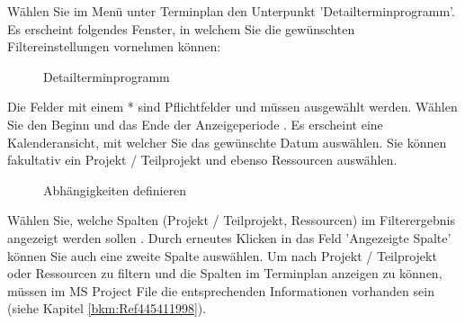 Wählen Sie im Menü unter Terminplan den Unterpunkt 'Detailterminprogramm'. Es erscheint folgendes Fenster, in welchem Sie die gewünschten Filtereinstellungen vornehmen können:

\begin{figure}[H]
\caption{Detailterminprogramm}
\end{figure}

Die Felder mit einem * sind Pflichtfelder und müssen ausgewählt werden. Wählen Sie den Beginn und das Ende der Anzeigeperiode . Es erscheint eine Kalenderansicht, mit welcher Sie das gewünschte Datum auswählen. Sie können fakultativ ein Projekt / Teilprojekt  und ebenso Ressourcen  auswählen.

\begin{figure}[H]
\caption{Abhängigkeiten definieren}
\end{figure}


Wählen Sie, welche Spalten (Projekt / Teilprojekt, Ressourcen) im Filterergebnis angezeigt werden sollen . Durch erneutes Klicken in das Feld 'Angezeigte Spalte' können Sie auch eine zweite Spalte auswählen. Um nach Projekt / Teilprojekt oder Ressourcen zu filtern und die Spalten im Terminplan anzeigen zu können, müssen im MS Project File die entsprechenden Informationen vorhanden sein (siehe Kapitel \ref{bkm:Ref445411998}).

